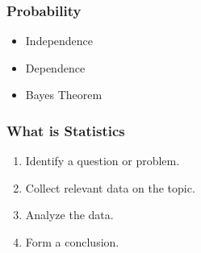 
\begin{frame}
  \frametitle{Probability}
  \begin{itemize}
  \item Independence
  \item Dependence
  \item Bayes Theorem
  \end{itemize}
\end{frame}


\begin{frame}[t]
  \frametitle{What is Statistics}

  \begin{enumerate}
  \item<1-3> Identify a question or problem.
  \item<1-3> Collect relevant data on the topic.
  \item<1-3> Analyze the data.
  \item<1-3> Form a conclusion.
  \end{enumerate}
\end{frame}

